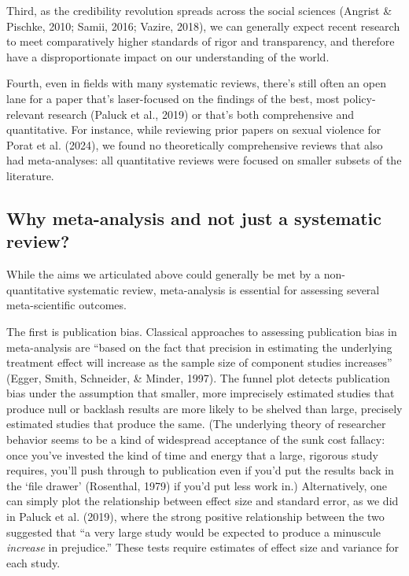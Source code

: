 \documentclass[
  ,jou]{apa6}
\begin{document}
Third, as the credibility revolution spreads across the social sciences (Angrist \& Pischke, 2010; Samii, 2016; Vazire, 2018), we can generally expect recent research to meet comparatively higher standards of rigor and transparency, and therefore have a disproportionate impact on our understanding of the world.

Fourth, even in fields with many systematic reviews, there's still often an open lane for a paper that's laser-focused on the findings of the best, most policy-relevant research (Paluck et al., 2019) or that's both comprehensive and quantitative. For instance, while reviewing prior papers on sexual violence for Porat et al. (2024), we found no theoretically comprehensive reviews that also had meta-analyses: all quantitative reviews were focused on smaller subsets of the literature.

\subsection{Why meta-analysis and not just a systematic review?}\label{why-meta-analysis-and-not-just-a-systematic-review}

While the aims we articulated above could generally be met by a non-quantitative systematic review, meta-analysis is essential for assessing several meta-scientific outcomes.

The first is publication bias. Classical approaches to assessing publication bias in meta-analysis are ``based on the fact that precision in estimating the underlying treatment effect will increase as the sample size of component studies increases'' (Egger, Smith, Schneider, \& Minder, 1997). The funnel plot detects publication bias under the assumption that smaller, more imprecisely estimated studies that produce null or backlash results are more likely to be shelved than large, precisely estimated studies that produce the same. (The underlying theory of researcher behavior seems to be a kind of widespread acceptance of the sunk cost fallacy: once you've invested the kind of time and energy that a large, rigorous study requires, you'll push through to publication even if you'd put the results back in the `file drawer' (Rosenthal, 1979) if you'd put less work in.) Alternatively, one can simply plot the relationship between effect size and standard error, as we did in Paluck et al. (2019), where the strong positive relationship between the two suggested that ``a very large study would be expected to produce a minuscule \emph{increase} in prejudice.'' These tests require estimates of effect size and variance for each study.
\end{document}
